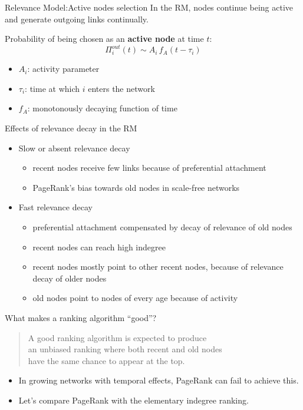 \begin{frame}{Relevance Model:\@ Active nodes selection}
    In the RM, nodes \alert{continue being active} and generate outgoing links continually.

    Probability of being chosen as an \textbf{active node} at time $t$:
    \[
        \Pi_i^{out}(t) \sim A_i \, f_A (t-\tau_i)
    \]
    \begin{itemize}
        \item $A_i$: activity parameter
        \item $\tau_i$: time at which $i$ enters the network
        \item $f_A$: monotonously decaying function of time
    \end{itemize}
\end{frame}

\begin{frame}{Effects of relevance decay in the RM}
\begin{itemize}
    \item \alert{Slow} or absent relevance decay
    \begin{itemize}
        \item recent nodes receive few links because of preferential attachment
        \item PageRank's bias towards old nodes in scale-free networks
    \end{itemize}
    \item \alert{Fast} relevance decay
    \begin{itemize}
        \item preferential attachment compensated by decay of relevance of old nodes
        \item recent nodes can reach high indegree
        \item recent nodes mostly point to other recent nodes, because of relevance decay of older nodes
        \item old nodes point to nodes of every age because of activity
    \end{itemize}
\end{itemize}
\end{frame}

\begin{frame}{What makes a ranking algorithm ``good''?}
    \begin{quote}
        A good ranking algorithm is expected to produce \\ an unbiased ranking where both \alert{recent} and \alert{old} nodes \\ have \alert{the same chance to appear at the top}.
    \end{quote}
    \begin{itemize}
        \item In growing networks with temporal effects, \alert{PageRank can fail} to achieve this.
        \item Let's compare PageRank with the elementary \alert{indegree ranking}.
    \end{itemize}
\end{frame}

